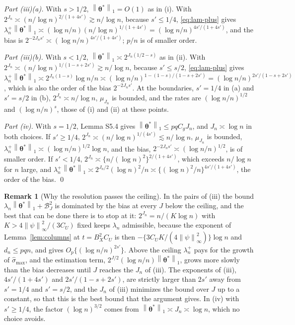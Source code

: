 \documentclass[10pt]{book}
\theoremstyle{definition}
\newtheorem{remark}{Remark}[section]
\newcommand{\norm}[1]{\left\lVert #1 \right\rVert}
\newcommand{\btheta}{\boldsymbol{\theta}}
\newcommand{\thetastar}{\btheta^{*}}
\newcommand{\penn}{\lambda_{n}}
\newcommand{\seff}{s'}
\newcommand{\smax}{\widehat{\sigma}_{\max}}
\begin{document}
{\emph{Part (iii)(a).} With $s > 1/2$, $\norm{\thetastar}_{1} = O(1)$ as in
(i). With $2^{J_n} \asymp (n/\log n)^{2/(1+4\seff)} \gtrsim n/\log n$,
because $\seff \le 1/4$, \eqref{eq:lam-plus} gives
$\penn^{+}\norm{\thetastar}_{1} \asymp (\log n/n)(n/\log n)^{1/(1+4\seff)} =
(\log n/n)^{4\seff/(1+4\seff)}$, and the bias is
$2^{-2J_n\seff} \asymp (\log n/n)^{4\seff/(1+4\seff)}$; $p/n$ is of smaller
order.

\emph{Part (iii)(b).} With $s < 1/2$, $\norm{\thetastar}_{1} \asymp
2^{J_n(1/2-s)}$ as in (ii). With
$2^{J_n} \asymp (n/\log n)^{1/(1-s+2\seff)} \gtrsim n/\log n$, because
$\seff \le s/2$, \eqref{eq:lam-plus} gives
$\penn^{+}\norm{\thetastar}_{1} \asymp 2^{J_n(1-s)}\log n/n \asymp
(\log n/n)^{1-(1-s)/(1-s+2\seff)} = (\log n/n)^{2\seff/(1-s+2\seff)}$, which
is also the order of the bias $2^{-2J_n\seff}$. At the boundaries,
$\seff = 1/4$ in (a) and $\seff = s/2$ in (b), $2^{J_n} \asymp n/\log n$,
$\mu_{J_n}$ is bounded, and the rates are $(\log n/n)^{1/2}$ and
$(\log n/n)^{s}$, those of (i) and (ii) at these points.

\emph{Part (iv).} With $s = 1/2$, Lemma S5.4 gives
$\norm{\thetastar}_{1} \le pqC_gJ_n$, and $J_n \asymp \log n$ in both
choices. If $\seff \ge 1/4$,
$2^{J_n} \asymp (n/\log n)^{1/(4\seff)} \lesssim n/\log n$, $\mu_{J_n}$ is
bounded, $\penn^{+}\norm{\thetastar}_{1} \asymp (\log n/n)^{1/2}\log n$,
and the bias, $2^{-2J_n\seff} \asymp (\log n/n)^{1/2}$, is of smaller order.
If $\seff < 1/4$, $2^{J_n} \asymp \{n/(\log n)^{2}\}^{2/(1+4\seff)}$, which
exceeds $n/\log n$ for $n$ large, and $\penn^{+}\norm{\thetastar}_{1} \asymp
2^{J_n/2}(\log n)^{2}/n \asymp \{(\log n)^{2}/n\}^{4\seff/(1+4\seff)}$, the
order of the bias. \qed

\begin{remark}[Why the resolution passes the ceiling]
\label{rem:ceiling}
In the pairs of (iii) the bound $\penn\norm{\thetastar}_{1} +
\mathcal{B}_{J}^{2}$ is dominated by the bias at every $J$ below the ceiling,
and the best that can be done there is to stop at it: $2^{J_n} = n/(K\log n)$
with $K > 4\norm{\psi}_{\infty}^{2}/(3C_U)$ fixed keeps $\penn$ admissible,
because the exponent of Lemma~\ref{lem:columns} at $t = B_X^{2}C_U$ is then
$-\{3C_UK/(4\norm{\psi}_{\infty}^{2})\}\log n$ and $d_n \le pqn$, and gives
$O_p\{(\log n/n)^{2\seff}\}$. Above the ceiling $\penn^{+}$ pays for the
growth of $\smax$, and the estimation term,
$2^{J/2}(\log n/n)\norm{\thetastar}_{1}$, grows more slowly than the bias
decreases until $J$ reaches the $J_n$ of (iii). The exponents of (iii),
$4\seff/(1+4\seff)$ and $2\seff/(1-s+2\seff)$, are strictly larger than
$2\seff$ away from $\seff = 1/4$ and $\seff = s/2$, and the $J_n$ of (iii)
minimizes the bound over $J$ up to a constant, so that this is the best bound
that the argument gives. In (iv) with $\seff \ge 1/4$, the factor
$(\log n)^{3/2}$ comes from $\norm{\thetastar}_{1} \asymp J_n \asymp \log n$,
which no choice avoids.
\end{remark}

}
\end{document}
